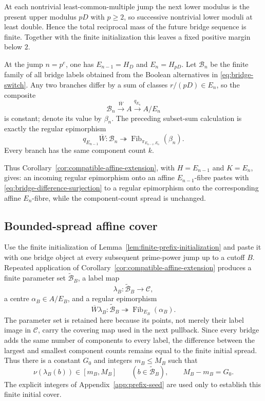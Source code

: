 At each nontrivial least-common-multiple jump the next lower modulus is the present upper modulus $pD$ with $p\ge2$, so successive nontrivial lower moduli at least double.  Hence the total reciprocal mass of the future bridge sequence is finite.  Together with the finite initialization this leaves a fixed positive margin below $2$.

At the jump $n=p^e$, one has $E_{n-1}=H_D$ and $E_n=H_{pD}$.  Let $\mathscr B_n$ be the finite family of all bridge labels obtained from the Boolean alternatives in \eqref{eq:bridge-switch}.  Any two branches differ by a sum of classes $r/(pD)\in E_n$, so the composite
\[
\mathscr B_n\xrightarrow{\overline W}A\xrightarrow{q_{E_n}}A/E_n
\]
is constant; denote its value by $\beta_n$.  The preceding subset-sum calculation is exactly the regular epimorphism
\begin{equation}\label{eq:bridge-difference-surjection}
q_{E_{n-1}}\overline W:
\mathscr B_n\twoheadrightarrow
\operatorname{Fib}_{\pi_{E_{n-1},E_n}}(\beta_n).
\end{equation}
Every branch has the same component count $k$.

Thus Corollary~\ref{cor:compatible-affine-extension}, with $H=E_{n-1}$ and $K=E_n$, gives: an incoming regular epimorphism onto an affine $E_{n-1}$-fibre pastes with \eqref{eq:bridge-difference-surjection} to a regular epimorphism onto the corresponding affine $E_n$-fibre, while the component-count spread is unchanged.

\subsection{Bounded-spread affine cover}

Use the finite initialization of Lemma~\ref{lem:finite-prefix-initialization} and paste it with one bridge object at every subsequent prime-power jump up to a cutoff $B$.  Repeated application of Corollary~\ref{cor:compatible-affine-extension} produces a finite parameter set $\widetilde{\mathcal B}_B$, a label map
\[
\lambda_B:\widetilde{\mathcal B}_B\longrightarrow\mathcal C,
\]
a centre $\alpha_B\in A/E_B$, and a regular epimorphism
\begin{equation}\label{eq:bounded-affine-cover}
\overline W\lambda_B:
\widetilde{\mathcal B}_B\twoheadrightarrow
\operatorname{Fib}_{E_B}(\alpha_B).
\end{equation}
The parameter set is retained here because its points, not merely their label image in $\mathcal C$, carry the covering map used in the next pullback.  Since every bridge adds the same number of components to every label, the difference between the largest and smallest component counts remains equal to the finite initial spread.  Thus there is a constant $G_0$ and integers $m_B\le M_B$ such that
\begin{equation}\label{eq:ragged-spread}
\nu(\lambda_B(b))\in[m_B,M_B]
\qquad(b\in\widetilde{\mathcal B}_B),
\qquad
M_B-m_B=G_0.
\end{equation}
The explicit integers of Appendix~\ref{app:prefix-seed} are used only to establish this finite initial cover.

